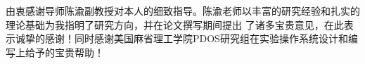 
\begin{ack}
  由衷感谢导师陈渝副教授对本人的细致指导。陈渝老师以丰富的研究经验和扎实的理论基础为我指明了研究方向，并在论文撰写期间提出
了诸多宝贵意见，在此表示诚挚的感谢！同时感谢美国麻省理工学院PDOS研究组在实验操作系统设计和编写上给予的宝贵帮助！
\end{ack}
